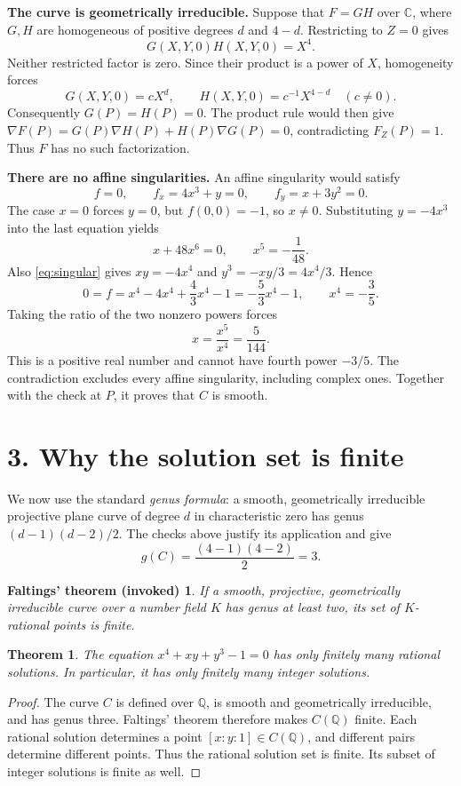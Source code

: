 \documentclass[11pt,a4paper]{article}
\newtheorem{theorem}{Theorem}
\newtheorem*{externaltheorem}{Faltings' theorem (invoked)}
\begin{document}
\textbf{The curve is geometrically irreducible.}
Suppose that $F=GH$ over $\mathbb C$, where $G,H$ are homogeneous of
positive degrees $d$ and $4-d$. Restricting to $Z=0$ gives
\[
 G(X,Y,0)H(X,Y,0)=X^4.
\]
Neither restricted factor is zero. Since their product is a power of $X$,
homogeneity forces
\[
 G(X,Y,0)=cX^d,\qquad H(X,Y,0)=c^{-1}X^{4-d}
 \quad(c\ne0).
\]
Consequently $G(P)=H(P)=0$. The product rule would then give
$\nabla F(P)=G(P)\nabla H(P)+H(P)\nabla G(P)=0$, contradicting
$F_Z(P)=1$. Thus $F$ has no such factorization.

\newpage
\textbf{There are no affine singularities.}
An affine singularity would satisfy
\begin{equation}
 f=0,\qquad f_x=4x^3+y=0,\qquad f_y=x+3y^2=0.
 \label{eq:singular}
\end{equation}
The case $x=0$ forces $y=0$, but $f(0,0)=-1$, so $x\ne0$.
Substituting $y=-4x^3$ into the last equation yields
\[
 x+48x^6=0,\qquad x^5=-\frac1{48}.
\]
Also \eqref{eq:singular} gives $xy=-4x^4$ and
$y^3=-xy/3=4x^4/3$. Hence
\[
 0=f=x^4-4x^4+\frac43x^4-1=-\frac53x^4-1,
 \qquad x^4=-\frac35.
\]
Taking the ratio of the two nonzero powers forces
\[
 x=\frac{x^5}{x^4}=\frac{5}{144}.
\]
This is a positive real number and cannot have fourth power $-3/5$.
The contradiction excludes every affine singularity, including complex
ones. Together with the check at $P$, it proves that $C$ is smooth.

\section*{3. Why the solution set is finite}

We now use the standard \emph{genus formula}: a smooth, geometrically
irreducible projective plane curve of degree $d$ in characteristic zero has
genus $(d-1)(d-2)/2$. The checks above justify its application and give
\[
 g(C)=\frac{(4-1)(4-2)}2=3.
\]

\begin{externaltheorem}
If a smooth, projective, geometrically irreducible curve over a number
field $K$ has genus at least two, its set of $K$-rational points is finite.
\end{externaltheorem}

\begin{theorem}
The equation $x^4+xy+y^3-1=0$ has only finitely many rational solutions.
In particular, it has only finitely many integer solutions.
\end{theorem}
\begin{proof}
The curve $C$ is defined over $\mathbb Q$, is smooth and geometrically
irreducible, and has genus three. Faltings' theorem therefore makes
$C(\mathbb Q)$ finite. Each rational solution determines a point
$[x:y:1]\in C(\mathbb Q)$, and different pairs determine different points.
Thus the rational solution set is finite. Its subset of integer solutions
is finite as well.
\end{proof}
\end{document}
